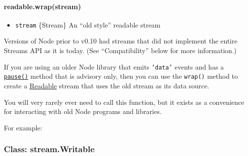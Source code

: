 \paragraph{readable.wrap(stream)}\label{readable.wrapstream}

\begin{itemize}
\itemsep1pt\parskip0pt
\item
  \texttt{stream} \{Stream\} An ``old style'' readable stream
\end{itemize}

Versions of Node prior to v0.10 had streams that did not implement the
entire Streams API as it is today. (See ``Compatibility'' below for more
information.)

If you are using an older Node library that emits \texttt{'data'} events
and has a \hyperref[streamux5freadableux5fpause]{\texttt{pause()}}
method that is advisory only, then you can use the \texttt{wrap()}
method to create a
\hyperref[streamux5fclassux5fstreamux5freadable]{Readable} stream that
uses the old stream as its data source.

You will very rarely ever need to call this function, but it exists as a
convenience for interacting with old Node programs and libraries.

For example:

\begin{Shaded}
\begin{Highlighting}[]
 \NormalTok{(}\NormalTok{;}
  
 \NormalTok{(}\NormalTok{;}
  

\NormalTok{(}\NormalTok{, }\NormalTok{() \{}
  \NormalTok{(); }
\NormalTok{\});}
\end{Highlighting}
\end{Shaded}

\subsubsection{Class: stream.Writable}\label{class-stream.writable}

